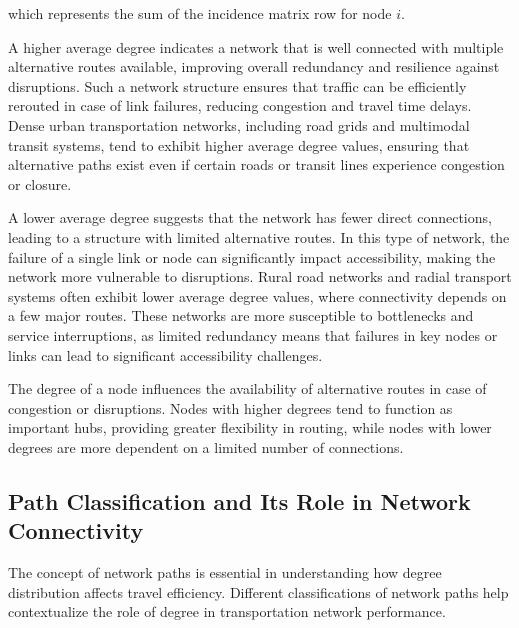 which represents the sum of the incidence matrix row for node \( i \).

A higher average degree indicates a network that is well connected with multiple alternative routes available, improving overall redundancy and resilience against disruptions. Such a network structure ensures that traffic can be efficiently rerouted in case of link failures, reducing congestion and travel time delays. Dense urban transportation networks, including road grids and multimodal transit systems, tend to exhibit higher average degree values, ensuring that alternative paths exist even if certain roads or transit lines experience congestion or closure.

A lower average degree suggests that the network has fewer direct connections, leading to a structure with limited alternative routes. In this type of network, the failure of a single link or node can significantly impact accessibility, making the network more vulnerable to disruptions. Rural road networks and radial transport systems often exhibit lower average degree values, where connectivity depends on a few major routes. These networks are more susceptible to bottlenecks and service interruptions, as limited redundancy means that failures in key nodes or links can lead to significant accessibility challenges.

The degree of a node influences the availability of alternative routes in case of congestion or disruptions. Nodes with higher degrees tend to function as important hubs, providing greater flexibility in routing, while nodes with lower degrees are more dependent on a limited number of connections.

\subsection{Path Classification and Its Role in Network Connectivity}
The concept of network paths is essential in understanding how degree distribution affects travel efficiency. Different classifications of network paths help contextualize the role of degree in transportation network performance.

